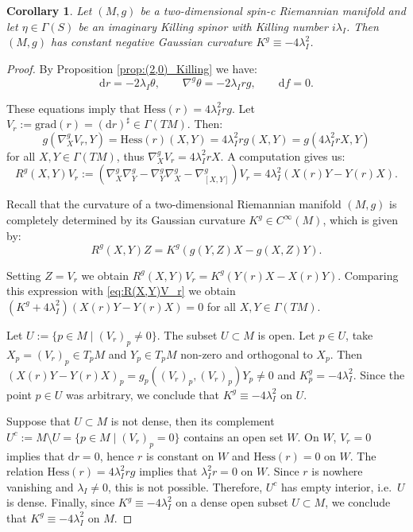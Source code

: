 \documentclass[10pt,a4paper,twoside,reqno]{amsart}
\theoremstyle{plain}
\newtheorem{cor}[thm]{Corollary}
\theoremstyle{definition}
\theoremstyle{remark}
\def\dd{\mathrm{d}}
\def\dd{\mathrm{d}}
\def\Hess{\mathrm{Hess}}
\begin{document}
\begin{cor}
    Let $(M,g)$ be a two-dimensional spin-c Riemannian manifold and let $\eta\in\Gamma(S)$ be an imaginary Killing spinor with Killing number $i\lambda_I$. Then $(M,g)$ has constant negative Gaussian curvature $K^g\equiv-4\lambda_I^2$.
\end{cor}

\begin{proof}
    By Proposition \ref{prop:(2,0)_Killing} we have: $$\dd r=-2\lambda_I\theta,\qquad \nabla^g\theta=-2\lambda_Irg,\qquad \dd f=0.$$

    These equations imply that $\Hess(r)=4\lambda_I^2rg$. Let $V_r:=\mathrm{grad}(r)=(\dd r)^\sharp\in\Gamma(TM)$. Then: $$g(\nabla^g_XV_r,Y)=\Hess(r)(X,Y)=4\lambda_I^2rg(X,Y)=g(4\lambda_I^2rX,Y)$$ for all $X,Y\in\Gamma(TM)$, thus $\nabla^g_XV_r=4\lambda_I^2rX$. A computation gives us: \begin{equation}\label{eq:R(X,Y)V_r}
        R^g(X,Y)V_r:=(\nabla^g_X\nabla^g_Y-\nabla^g_Y\nabla^g_X-\nabla^g_{[X,Y]})V_r=4\lambda_I^2(X(r)Y-Y(r)X).
    \end{equation}

    Recall that the curvature of a two-dimensional Riemannian manifold $(M,g)$ is completely determined by its Gaussian curvature $K^g\in C^\infty(M)$, which is given by: $$R^g(X,Y)Z=K^g(g(Y,Z)X-g(X,Z)Y).$$

    Setting $Z=V_r$ we obtain $R^g(X,Y)V_r=K^g(Y(r)X-X(r)Y)$. Comparing this expression with \eqref{eq:R(X,Y)V_r} we obtain $(K^g+4\lambda_I^2)(X(r)Y-Y(r)X)=0$ for all $X,Y\in\Gamma(TM)$.\medskip
    
    Let $U:=\{p\in M\mid (V_r)_p\neq0\}$. The subset $U\subset M$ is open. Let $p\in U$, take $X_p=(V_r)_p\in T_pM$ and $Y_p\in T_pM$ non-zero and orthogonal to $X_p$. Then $(X(r)Y-Y(r)X)_p=g_p((V_r)_p,(V_r)_p)Y_p\neq0$ and $K^g_p=-4\lambda_I^2$. Since the point $p\in U$ was arbitrary, we conclude that $K^g\equiv-4\lambda_I^2$ on $U$.\medskip

    Suppose that $U\subset M$ is not dense, then its complement $U^c:=M\setminus U=\{p\in M\mid(V_r)_p=0\}$ contains an open set $W$. On $W$, $V_r=0$ implies that $\dd r=0$, hence $r$ is constant on $W$ and $\Hess(r)=0$ on $W$. The relation $\Hess(r)=4\lambda_I^2rg$ implies that $\lambda_I^2r=0$ on $W$. Since $r$ is nowhere vanishing and $\lambda_I\neq0$, this is not possible. Therefore, $U^c$ has empty interior, i.e.\ $U$ is dense. Finally, since $K^g\equiv-4\lambda_I^2$ on a dense open subset $U\subset M$, we conclude that $K^g\equiv-4\lambda_I^2$ on $M$.
\end{proof}
\end{document}

